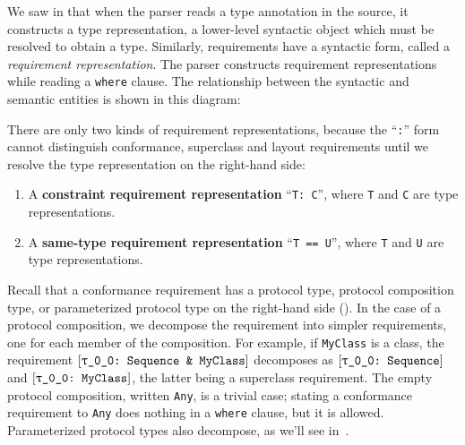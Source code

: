 \documentclass[../generics]{subfiles}
\begin{document}
We saw in  that when the parser reads a type annotation in the source, it constructs a type representation, a lower-level syntactic object which must be resolved to obtain a type. Similarly, requirements have a syntactic form, called a \emph{requirement representation}. The parser constructs requirement representations while reading a \texttt{where} clause. The relationship between the syntactic and semantic entities is shown in this diagram:
\begin{center}
\end{center}
There are only two kinds of requirement representations, because the ``\texttt{:}'' form cannot distinguish conformance, superclass and layout requirements until we resolve the type representation on the right-hand side:
\begin{enumerate}
\item A \textbf{constraint requirement representation} ``\texttt{T:\ C}'', where \texttt{T} and \texttt{C} are type representations.
\item A \textbf{same-type requirement representation} ``\texttt{T == U}'', where \texttt{T} and \texttt{U} are type representations.
\end{enumerate}

Recall that a conformance requirement has a protocol type, protocol composition type, or parameterized protocol type on the right-hand side (). In the case of a protocol composition, we decompose the requirement into simpler requirements, one for each member of the composition. For example, if \texttt{MyClass} is a class, the requirement $[\texttt{\texttt{$\uptau$\_0\_0}:~Sequence~\&~MyClass}]$ decomposes as $[\texttt{\texttt{$\uptau$\_0\_0}:~Sequence}]$ and $[\texttt{\texttt{$\uptau$\_0\_0}:~MyClass}]$, the latter being a superclass requirement. The empty protocol composition, written \texttt{Any}, is a trivial case; stating a conformance requirement to \texttt{Any} does nothing in a \texttt{where} clause, but it is allowed. Parameterized protocol types also decompose, as we'll see in~.
\end{document}
